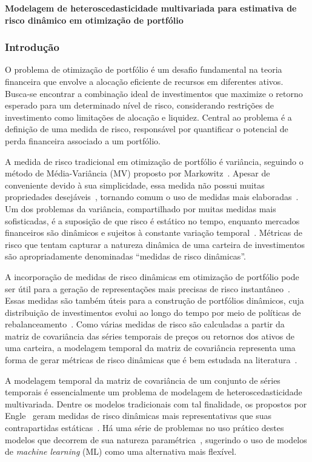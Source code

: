 \documentclass[a4paper, 12pt]{article}
\begin{document}
\textbf{Modelagem de heteroscedasticidade multivariada para estimativa de risco
dinâmico em otimização de portfólio}
\subsubsection*{Introdução}
\begin{spacing}{.9}

O problema de otimização de portfólio é um desafio fundamental na teoria
financeira que envolve a alocação eficiente de recursos em diferentes
ativos. Busca-se encontrar a combinação ideal de investimentos que maximize
o retorno esperado para um determinado nível de risco, considerando
restrições de investimento como limitações de alocação e liquidez. Central
ao problema é a definição de uma medida de risco, responsável por
quantificar o potencial de perda financeira associado a um portfólio.%

A medida de risco tradicional em otimização de portfólio é variância, seguindo
o método de Média-Variância (MV) proposto por Markowitz~\cite{markowitz}.
Apesar de conveniente devido à sua simplicidade, essa medida não possui
muitas propriedades desejáveis~\cite{rachev}, tornando comum o uso de
medidas mais elaboradas~\cite{gambrah2014risk}. Um dos problemas da
variância, compartilhado por muitas medidas mais sofisticadas, é a
suposição de que risco é estático no tempo, enquanto mercados financeiros são
dinâmicos e sujeitos à constante variação temporal~\cite{procacci}.
Métricas de risco que tentam capturar a natureza dinâmica de uma carteira
de investimentos são apropriadamente denominadas ``medidas de risco
dinâmicas''.

A incorporação de medidas de risco dinâmicas em otimização de portfólio pode
ser útil para a geração de representações mais precisas de risco
instantâneo~\cite{chan1999portfolio}. Essas medidas são também úteis para a
construção de portfólios dinâmicos, cuja distribuição de investimentos
evolui ao longo do tempo por meio de políticas de
rebalanceamento~\cite{metin, holten}. Como várias medidas de risco são
calculadas a partir da matriz de covariância das séries temporais de preços
ou retornos dos ativos de uma carteira, a modelagem temporal da matriz de
covariância representa uma forma de gerar métricas de risco dinâmicas que é bem
estudada na literatura~\cite{chan1999portfolio}.

A modelagem temporal da matriz de covariância de um conjunto de séries
temporais é essencialmente um problema de modelagem de heteroscedasticidade
multivariada. Dentre os modelos tradicionais com tal finalidade, os propostos
por Engle~\cite{bauwens} geram medidas de risco dinâmicas mais representativas
que suas contrapartidas estáticas~\cite{metin, holten, weirum}. Há uma série de
problemas no uso prático destes modelos que decorrem de sua natureza
paramétrica~\cite{morettin}, sugerindo o uso de modelos de \emph{machine
learning} (ML) como uma alternativa mais flexível.


\end{spacing}
\end{document}
